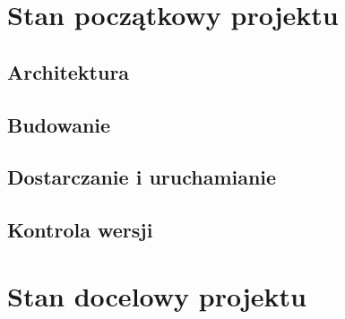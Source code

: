 \chapter{Stan początkowy projektu}
\label{cha:pocz}

\section{Architektura}

\section{Budowanie}

\section{Dostarczanie i uruchamianie}

\section{Kontrola wersji}


\chapter{Stan docelowy projektu}
\label{cha:docel}


